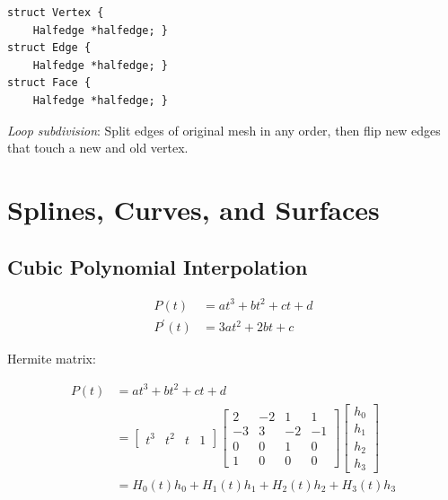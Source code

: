\documentclass[10pt,landscape]{article}
\begin{document}
\begin{multicols}{3}
\begin{multicols}{2}
\columnbreak

\begin{verbatim}
struct Vertex {
    Halfedge *halfedge; }
struct Edge {
    Halfedge *halfedge; }
struct Face {
    Halfedge *halfedge; }
\end{verbatim}
\end{multicols}

\textit{Loop subdivision}: Split edges of original mesh in any order, then flip new edges that touch a new and old vertex.


\section{Splines, Curves, and Surfaces}

\subsection{Cubic Polynomial Interpolation}

\begin{align*}
    P(t) &= at^3 + bt^2 + ct + d \\
    P^{\prime}(t) &= 3at^2 + 2bt + c
\end{align*}

Hermite matrix:

\begin{align*}
    P(t) &= at^3 + bt^2 + ct + d \\
    &=  \begin{bmatrix}
            t^3 & t^2 & t & 1
        \end{bmatrix}
        \begin{bmatrix}
            2 & -2 & 1 & 1 \\
            -3 & 3 & -2 & -1 \\
            0 & 0 & 1 & 0 \\
            1 & 0 & 0 & 0
        \end{bmatrix}
        \begin{bmatrix}
            h_0 \\
            h_1 \\
            h_2 \\
            h_3
        \end{bmatrix} \\
    &= H_0(t)h_0 + H_1(t)h_1 + H_2(t)h_2 + H_3(t)h_3
\end{align*}


\end{multicols}
\end{document}
